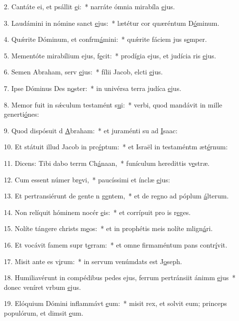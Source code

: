 2. Cantáte ei, et psállit \uline{e}i:~* narráte ómnia mirabíla \uline{e}jus.\par 
3. Laudámini in nómine sanct \uline{e}jus:~* lætétur cor quæréntum D\uline{ó}minum.\par 
4. Quǽrite Dóminum, et confrm\uline{á}mini:~* quǽrite fáciem jus s\uline{e}mper.\par 
5. Mementóte mirabílium ejus,  f\uline{e}cit:~* prodígia ejus, et judícia ris \uline{e}jus.\par 
6. Semen Abraham, serv \uline{e}jus:~* fílii Jacob, elcti \uline{e}jus.\par 
7. Ipse Dóminus Des n\uline{o}ster:~* in univérsa terra judíca \uline{e}jus.\par 
8. Memor fuit in sǽculum testamént s\uline{u}i:~* verbi, quod mandávit in mille generti\uline{ó}nes:\par 
9. Quod dispósuit d \uline{A}braham:~* et juraménti su ad \uline{I}saac:\par 
10. Et státuit illud Jacob in prc\uline{é}ptum:~* et Israël in testaméntm æt\uline{é}rnum:\par 
11. Dicens: Tibi dabo terrm Ch\uline{á}naan,~* funículum heredittis v\uline{e}stræ.\par 
12. Cum essent númer br\uline{e}vi,~* paucíssimi et ínclæ \uline{e}jus:\par 
13. Et pertransiérunt de gente n g\uline{e}ntem,~* et de regno ad póplum \uline{á}lterum.\par 
14. Non relíquit hóminem nocér \uline{e}is:~* et corrípuit pro is r\uline{e}ges.\par 
15. Nolíte tángere christs m\uline{e}os:~* et in prophétis meis nolíte mlign\uline{á}ri.\par 
16. Et vocávit famem supr t\uline{e}rram:~* et omne firmaméntum pans contr\uline{í}vit.\par 
17. Misit ante es v\uline{i}rum:~* in servum venúmdats est J\uline{o}seph.\par 
18. Humiliavérunt in compédibus pedes ejus, ferrum pertránsiit ánimm \uline{e}jus~* donec veníret vrbum \uline{e}jus.\par 
19. Elóquium Dómini inflammávt \uline{e}um:~* misit rex, et solvit eum; princeps populórum, et dimsit \uline{e}um.\par 
